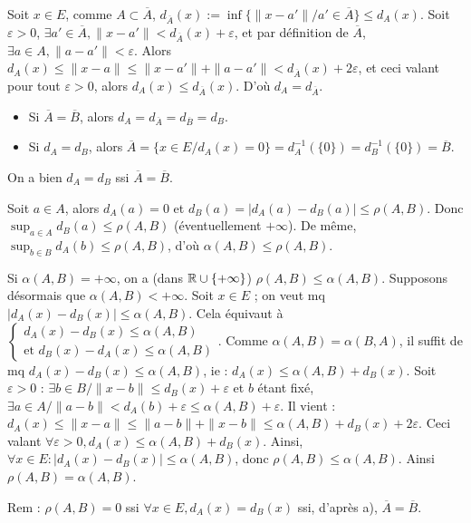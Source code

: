 \begin{solution}
Soit $x \in E$, comme $A \subset \overline{A}$, $d_{\overline{A}}(x) := \inf \{\|x - a'\| / a' \in \overline{A}\} \leq d_A(x)$.
Soit $\varepsilon > 0$, $\exists a' \in \overline{A}, \|x - a'\| < d_{\overline{A}}(x) + \varepsilon$, et par définition de $\overline{A}$, $\exists a \in A, \|a - a'\| < \varepsilon$.
Alors $d_A(x) \leq \|x - a\| \leq \|x - a'\| + \|a - a'\| < d_{\overline{A}}(x) + 2\varepsilon$, et ceci valant pour tout $\varepsilon > 0$, alors $d_A(x) \leq d_{\overline{A}}(x)$. D'où $d_A = d_{\overline{A}}$.
\begin{itemize}
  \item Si $\overline{A} = \overline{B}$, alors $d_A = d_{\overline{A}} = d_{\overline{B}} = d_B$.
  \item Si $d_A = d_B$, alors $\overline{A} = \{x \in E / d_A(x) = 0\} = d_A^{-1}(\{0\}) = d_B^{-1}(\{0\}) = \overline{B}$.
\end{itemize}
On a bien $d_A = d_B$ ssi $\overline{A} = \overline{B}$.

Soit $a \in A$, alors $d_A(a) = 0$ et $d_B(a) = |d_A(a) - d_B(a)| \leq \rho(A, B)$.
Donc $\sup_{a \in A} d_B(a) \leq \rho(A, B)$ (éventuellement $+\infty$). De même, $\sup_{b \in B} d_A(b) \leq \rho(A, B)$, d'où $\alpha(A, B) \leq \rho(A, B)$.

Si $\alpha(A, B) = +\infty$, on a (dans $\mathbb R \cup \{+\infty\}$) $\rho(A, B) \leq \alpha(A, B)$.
Supposons désormais que $\alpha(A, B) < +\infty$.
Soit $x \in E$ ; on veut mq $|d_A(x) - d_B(x)| \leq \alpha(A, B)$. Cela équivaut à $\begin{cases} d_A(x) - d_B(x) \leq \alpha(A, B) \\ \text{et } d_B(x) - d_A(x) \leq \alpha(A, B) \end{cases}$.
Comme $\alpha(A, B) = \alpha(B, A)$, il suffit de mq $d_A(x) - d_B(x) \leq \alpha(A, B)$, ie : $d_A(x) \leq \alpha(A, B) + d_B(x)$.
Soit $\varepsilon > 0$ : $\exists b \in B / \|x - b\| \leq d_B(x) + \varepsilon$ et $b$ étant fixé, $\exists a \in A / \|a - b\| < d_A(b) + \varepsilon \leq \alpha(A, B) + \varepsilon$.
Il vient : $d_A(x) \leq \|x - a\| \leq \|a - b\| + \|x - b\| \leq \alpha(A, B) + d_B(x) + 2\varepsilon$.
Ceci valant $\forall \varepsilon > 0, d_A(x) \leq \alpha(A, B) + d_B(x)$. Ainsi, $\forall x \in E : |d_A(x) - d_B(x)| \leq \alpha(A, B)$, donc $\rho(A, B) \leq \alpha(A, B)$.
Ainsi $\boxed{\rho(A, B) = \alpha(A, B)}$.

\begin{remarkbox}
Rem : $\rho(A, B) = 0$ ssi $\forall x \in E, d_A(x) = d_B(x)$ ssi, d'après a), $\overline{A} = \overline{B}$.
\end{remarkbox}
\end{solution}

